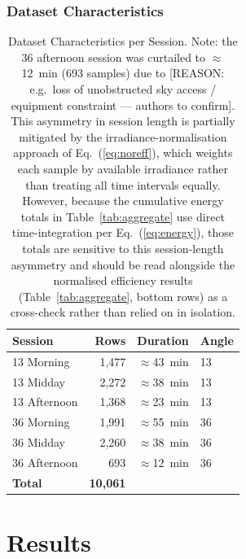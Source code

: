 \documentclass[conference]{IEEEtran}
\begin{document}
\subsubsection{Dataset Characteristics}
\begin{table}[H]
  \caption{Dataset Characteristics per Session. Note: the 36\degree{} afternoon session
           was curtailed to $\approx$12~min (693 samples) due to [REASON: e.g.\ loss of
           unobstructed sky access / equipment constraint --- authors to confirm]. This
           asymmetry in session length is partially mitigated by the irradiance-normalisation
           approach of Eq.~(\ref{eq:noreff}), which weights each sample by available
           irradiance rather than treating all time intervals equally. However, because the
           cumulative energy totals in Table~\ref{tab:aggregate} use direct time-integration
           per Eq.~(\ref{eq:energy}), those totals are sensitive to this session-length
           asymmetry and should be read alongside the normalised efficiency results
           (Table~\ref{tab:aggregate}, bottom rows) as a cross-check rather than
           relied on in isolation.}
  \label{tab:dataset}
  \centering
  \renewcommand{\arraystretch}{1.2}
  \begin{tabular}{@{}lrrl@{}}
    \toprule
    Session & Rows & Duration & Angle \\
    \midrule
    13\degree{} Morning   & 1{,}477 & $\approx$43~min & 13\degree{} \\
    13\degree{} Midday    & 2{,}272 & $\approx$38~min & 13\degree{} \\
    13\degree{} Afternoon & 1{,}368 & $\approx$23~min & 13\degree{} \\
    \midrule
    36\degree{} Morning   & 1{,}991 & $\approx$55~min & 36\degree{} \\
    36\degree{} Midday    & 2{,}260 & $\approx$38~min & 36\degree{} \\
    36\degree{} Afternoon &    693  & $\approx$12~min & 36\degree{} \\
    \midrule
    \textbf{Total}        & \textbf{10{,}061} & & \\
    \bottomrule
  \end{tabular}
\end{table}

\section{Results}
\label{sec:results}
\end{document}
